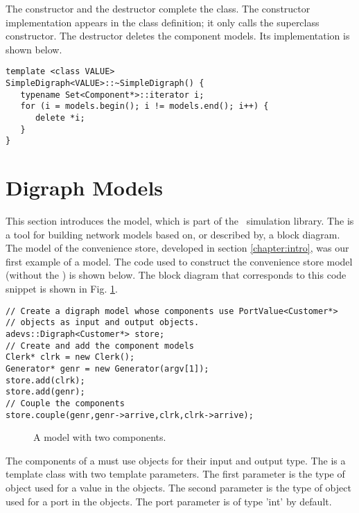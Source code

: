 The constructor and the destructor complete the class. The constructor implementation appears in the class definition; it only calls the superclass constructor. The destructor deletes the component models. Its implementation is shown below.
\begin{verbatim}
template <class VALUE>
SimpleDigraph<VALUE>::~SimpleDigraph() {
   typename Set<Component*>::iterator i;
   for (i = models.begin(); i != models.end(); i++) {
      delete *i;
   }
}
\end{verbatim}
 
\section{Digraph Models}
\label{section:digraph_models}
This section introduces the  model, which is part of the \adevs\ simulation library. The  is a tool for building network models based on, or described by, a block diagram. The model of the convenience store, developed in section \ref{chapter:intro}, was our first example of a  model. The code used to construct the convenience store model (without the ) is shown below. The block diagram that corresponds to this code snippet is shown in Fig. \ref{fig:two_component_diagram}.
\begin{verbatim}
// Create a digraph model whose components use PortValue<Customer*>
// objects as input and output objects.
adevs::Digraph<Customer*> store;
// Create and add the component models
Clerk* clrk = new Clerk();
Generator* genr = new Generator(argv[1]);
store.add(clrk);
store.add(genr);
// Couple the components
store.couple(genr,genr->arrive,clrk,clrk->arrive);
\end{verbatim}
\begin{figure}[ht]
\centering
{}
\caption{A  model with two components.}
\label{fig:two_component_diagram}
\end{figure}

The components of a  must use  objects for their input and output type.  The  is a template class with two template parameters. The first parameter is the type of object used for a value in the  objects. The second parameter is the type of object used for a port in the  objects. The port parameter is of type 'int' by default.

